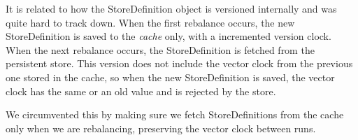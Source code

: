 It is related to how the StoreDefinition object is versioned internally and was quite hard to track down. When the first rebalance occurs, the new StoreDefinition is saved to the \emph{cache} only, with a incremented version clock. When the next rebalance occurs, the StoreDefinition is fetched from the persistent store. This version does not include the vector clock from the previous one stored in the cache, so when the new StoreDefinition is saved, the vector clock has the same or an old value and is rejected by the store.

We circumvented this by making sure we fetch StoreDefinitions from the cache only when we are rebalancing, preserving the vector clock between runs.


